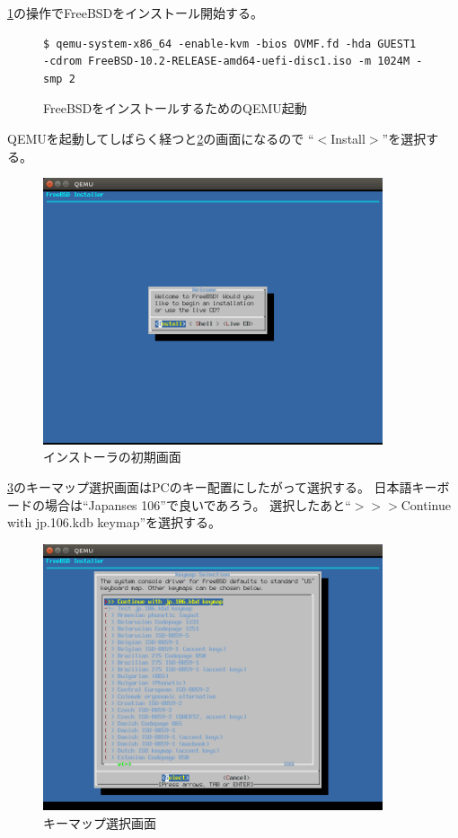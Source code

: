 \documentclass[a4j]{jarticle}
\begin{document}
\ref{fig:FreeBSD_QEMU}の操作でFreeBSDをインストール開始する。
\begin{figure}[htbp]
	\begin{center}
		\begin{lstlisting}[basicstyle=\ttfamily\footnotesize, frame=single, breaklines=true]
$ qemu-system-x86_64 -enable-kvm -bios OVMF.fd -hda GUEST1  -cdrom FreeBSD-10.2-RELEASE-amd64-uefi-disc1.iso -m 1024M -smp 2
		\end{lstlisting}
	\end{center}
	\caption{FreeBSDをインストールするためのQEMU起動}
	\label{fig:FreeBSD_QEMU}
\end{figure}
QEMUを起動してしばらく経つと\ref{fig:FreeBSD_TOP}の画面になるので
``$<$Install$>$''を選択する。
\begin{figure}[htbp]
	\begin{center}
    	\includegraphics[width=10cm]{./IMG/FreeBSD_TOP.png}
	\end{center}
    \caption{インストーラの初期画面}
    \label{fig:FreeBSD_TOP}
\end{figure}

\ref{fig:FreeBSD_KEY}のキーマップ選択画面はPCのキー配置にしたがって選択する。
日本語キーボードの場合は``Japanses 106''で良いであろう。
選択したあと``$>>>$Continue with jp.106.kdb keymap''を選択する。
\begin{figure}[htbp]
	\begin{center}
    	\includegraphics[width=10cm]{./IMG/FreeBSD_JP106.png}
	\end{center}
    \caption{キーマップ選択画面}
    \label{fig:FreeBSD_KEY}
\end{figure}
\end{document}
